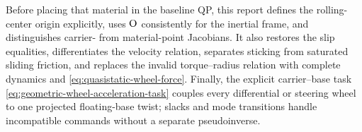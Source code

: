 \documentclass[10pt]{article}
\begin{document}
Before placing that material in the baseline QP, this report defines the
rolling-center origin explicitly, uses $\text{O}$ consistently for the
inertial frame, and distinguishes carrier- from material-point Jacobians. It
also restores the slip equalities, differentiates the velocity relation,
separates sticking from saturated sliding friction, and replaces the invalid
torque--radius relation with complete dynamics and
\eqref{eq:quasistatic-wheel-force}. Finally, the explicit carrier--base task
\eqref{eq:geometric-wheel-acceleration-task} couples every differential or
steering wheel to one projected floating-base twist; slacks and mode
transitions handle incompatible commands without a separate pseudoinverse.
\end{document}
